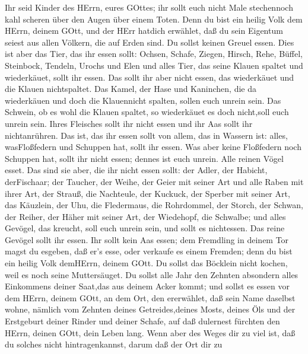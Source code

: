  Ihr seid Kinder des HErrn, eures GOttes; ihr sollt euch
nicht Male stechennoch kahl scheren über den Augen über einem Toten.
 Denn du bist ein heilig Volk dem HErrn, deinem GOtt, und
der HErr hatdich erwählet, daß du sein Eigentum seiest aus allen
Völkern, die auf Erden sind.  Du sollst keinen Greuel essen.
 Dies ist aber das Tier, das ihr essen sollt: Ochsen,
Schafe, Ziegen,  Hirsch, Rehe, Büffel, Steinbock, Tendeln,
Urochs und Elen  und alles Tier, das seine Klauen spaltet
und wiederkäuet, sollt ihr essen.  Das sollt ihr aber nicht
essen, das wiederkäuet und die Klauen nichtspaltet. Das Kamel, der Hase
und Kaninchen, die da wiederkäuen und doch die Klauennicht spalten,
sollen euch unrein sein.  Das Schwein, ob es wohl die Klauen
spaltet, so wiederkäuet es doch nicht,soll euch unrein sein. Ihres
Fleisches sollt ihr nicht essen und ihr Aas sollt ihr nichtanrühren.
 Das ist, das ihr essen sollt von allem, das in Wassern ist:
alles, wasFloßfedern und Schuppen hat, sollt ihr essen. 
Was aber keine Floßfedern noch Schuppen hat, sollt ihr nicht essen;
dennes ist euch unrein.  Alle reinen Vögel esset.
 Das sind sie aber, die ihr nicht essen sollt: der Adler,
der Habicht, derFischaar;  der Taucher, der Weihe, der
Geier mit seiner Art  und alle Raben mit ihrer Art,
 der Strauß, die Nachteule, der Kuckuck, der Sperber mit
seiner Art,  das Käuzlein, der Uhu, die Fledermaus,
 die Rohrdommel, der Storch, der Schwan,  der
Reiher, der Häher mit seiner Art, der Wiedehopf, die Schwalbe;
 und alles Gevögel, das kreucht, soll euch unrein sein, und
sollt es nichtessen.  Das reine Gevögel sollt ihr essen.
 Ihr sollt kein Aas essen; dem Fremdling in deinem Tor
magst du esgeben, daß er's esse, oder verkaufe es einem Fremden; denn du
bist ein heilig Volk demHErrn, deinem GOtt. Du sollst das Böcklein nicht
kochen, weil es noch seine Muttersäuget.  Du sollst alle
Jahr den Zehnten absondern alles Einkommens deiner Saat,das aus deinem
Acker kommt;  und sollst es essen vor dem HErrn, deinem
GOtt, an dem Ort, den ererwählet, daß sein Name daselbst wohne, nämlich
vom Zehnten deines Getreides,deines Mosts, deines Öls und der Erstgeburt
deiner Rinder und deiner Schafe, auf daß dulernest fürchten den HErrn,
deinen GOtt, dein Leben lang.  Wenn aber des Weges dir zu
viel ist, daß du solches nicht hintragenkannst, darum daß der Ort dir zu
